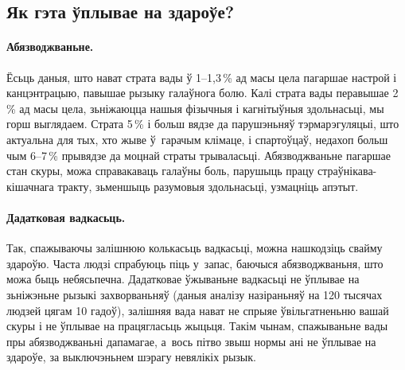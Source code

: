 \subsection{Як гэта ўплывае на здароўе?}

\paragraph{Абязводжваньне.}
Ёсьць даныя, што нават страта вады ў 1--1,3\,\% ад масы цела пагаршае настрой і канцэнтрацыю, павышае рызыку галаўнога болю. Калі страта вады перавышае 2\,\% ад масы цела, зьніжаюцца нашыя фізычныя і кагнітыўныя здольнасьці, мы горш выглядаем. Страта 5\,\% і больш вядзе да парушэньняў тэрмарэгуляцыі, што актуальна для тых, хто жыве ў~гарачым клімаце, і спартоўцаў, недахоп больш чым 6--7\,\% прывядзе да моцнай страты трываласьці. Абязводжваньне пагаршае стан скуры, можа справакаваць галаўны боль, парушыць працу страўнікава-кішачнага тракту, зьменшыць разумовыя здольнасьці, узмацніць апэтыт.


\paragraph{Дадатковая вадкасьць.}
Так, спажываючы залішнюю колькасьць вадкасьці, можна нашкодзіць свайму здароўю. Часта людзі спрабуюць піць у~запас, баючыся абязводжваньня, што можа быць небясьпечна. Дадатковае ўжываньне вадкасьці не ўплывае на зьніжэньне рызыкі захворваньняў (даныя аналізу назіраньняў на 120 тысячах людзей цягам 10 гадоў), залішняя вада нават не спрыяе ўвільгатненьню вашай скуры і не ўплывае на працягласьць жыцьця. Такім чынам, спажываньне вады пры абязводжваньні дапамагае, а~вось пітво звыш нормы ані не ўплывае на здароўе, за выключэньнем шэрагу невялікіх рызык.

